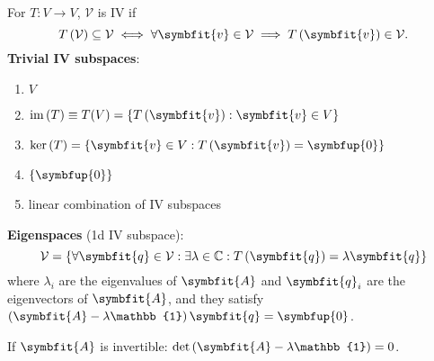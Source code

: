 \documentclass{article}
\begin{document}
\begin{minipage}[t]{126.1962963mm}
\begin{multicols*}{2}
        For $T:V\rightarrow V$, $\mathcal{V}$ is IV if
        \begin{equation*}
            T\left(\mathcal{V}\right)\subseteq \mathcal{V}\iff\forall \symbfit{v}
            \in \mathcal{V}\implies T\left(\symbfit{v}\right)\in \mathcal{V}.
        \end{equation*}
        \textbf{Trivial IV subspaces}:
        \begin{enumerate}
            \item $V$
            \item $\vim{\left( T \right)} \equiv T(V) = \left\{ T\left(\symbfit{v}\right) : \symbfit{v}\in V \right\}$
            \item $\vker{\left( T \right)} = \left\{ \symbfit{v}\in V : T\left(\symbfit{v}\right) = \symbfup{0} \right\}$
            \item $\left\{ \symbfup{0} \right\}$
            \item linear combination of IV subspaces
        \end{enumerate}
        \textbf{Eigenspaces} (1d IV subspace):
        \begin{equation*}
            \mathcal{V} = \left\{ \forall \symbfit{q}\in \mathcal{V}:\exists
            \lambda \in \mathbb{C}:T\left(\symbfit{q}\right) = \lambda \symbfit{q} \right\}
        \end{equation*}
        where $\lambda_i$ are the eigenvalues of $\symbfit{A}$ and
        $\symbfit{q}_i$ are the eigenvectors of $\symbfit{A}$, and they satisfy
        $\left( \symbfit{A} - \lambda \mathbb{1} \right) \symbfit{q}=\symbfup{0}$.

        If $\symbfit{A}$ is invertible:
        $\det{\left( \symbfit{A} - \lambda\mathbb{1} \right)} = 0$.


\end{multicols*}
\end{minipage}
\end{document}
